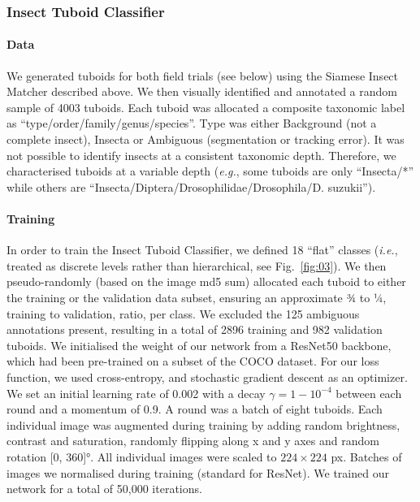 \documentclass[12pt]{article}
\begin{document}
\begin{linenumbers}
		\subsubsection*{Insect Tuboid Classifier}
		\paragraph{Data}
		We generated tuboids for both field trials (see below) using the Siamese Insect Matcher described above. We then visually identified and annotated a random sample of 4003 tuboids. Each tuboid was allocated a composite taxonomic label as “type/order/family/genus/species”. 
		Type was either Background (not a complete insect), Insecta or Ambiguous (segmentation or tracking error). It was not possible to identify insects at a consistent taxonomic depth. Therefore, we characterised tuboids at a variable depth (\emph{e.g.}, some tuboids are only “Insecta/*” while others are “Insecta/Diptera/Drosophilidae/Drosophila/D. suzukii”).
		
		\paragraph{Training}
		In order to train the Insect Tuboid Classifier, we defined 18 “flat” classes (\emph{i.e.}, treated as discrete levels rather than hierarchical, see Fig.~\ref{fig:03}). We then pseudo-randomly (based on the image md5 sum) allocated each tuboid to either the training or the validation data subset, ensuring an approximate ¾ to ¼, training to validation, ratio, per class. We excluded the 125 ambiguous annotations present, resulting in a total of 2896 training and 982 validation tuboids. 
		We initialised the weight of our network from a ResNet50 backbone, which had been pre-trained on a subset of the COCO dataset. For our loss function, we used cross-entropy, and stochastic gradient descent as an optimizer. We set an initial learning rate of 0.002 with a decay $\gamma = 1- 10^{-4}$ between each round and a momentum of 0.9. A round was a batch of eight tuboids. Each individual image was augmented during training by adding random brightness, contrast and saturation, randomly flipping along x and y axes and random rotation [0, 360]°. All individual images were scaled to $224 \times{} 224$ px. Batches of images we normalised during training (standard for ResNet). We trained our network for a total of 50,000 iterations.
		

\end{linenumbers}
\end{document}
